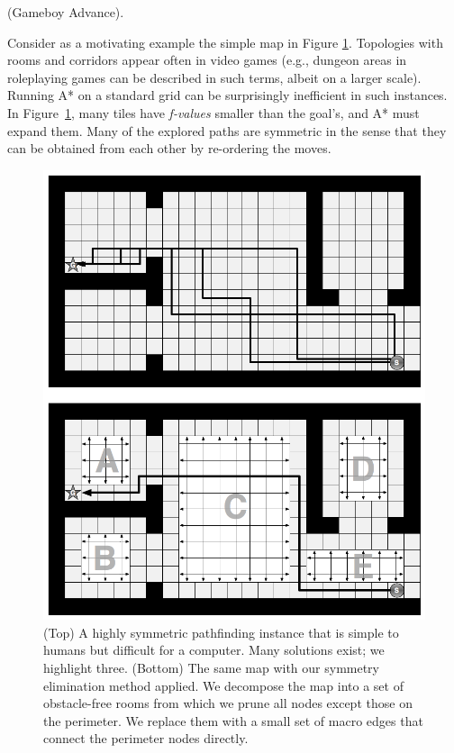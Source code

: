 (Gameboy Advance). 
\par
Consider as a motivating example the simple map in Figure \ref{fig-overview}.
Topologies with rooms and corridors appear often in video games 
(e.g., dungeon areas in roleplaying games
can be described in such terms, albeit on a larger scale).
Running A* on a standard grid can be surprisingly inefficient in such instances.
In Figure~\ref{fig-overview}, many tiles have \emph{f-values} smaller than the goal's,
and A* must expand them.
Many of the explored paths are symmetric in the sense that they can be obtained from each other
by re-ordering the moves.

\begin{figure}[tb]
       \begin{center}
                       \includegraphics[scale=0.30, trim = 10mm 10mm 10mm 0mm]{diagrams/overview.png}
       \end{center}
	\vspace{-3pt}
       \caption{(Top) A highly symmetric pathfinding instance that is simple to humans but difficult 
				for a computer.
				Many solutions exist; we highlight three. 
				(Bottom) The same map with our symmetry elimination method applied. We decompose the map
				into a set of obstacle-free rooms from which we prune all nodes except those on the perimeter.
				We replace them with a small set of macro edges that connect the perimeter nodes directly.} 
       \label{fig-overview}
\end{figure}

